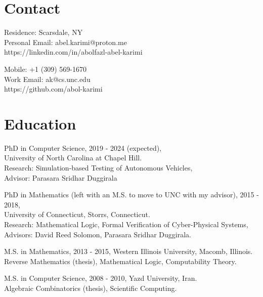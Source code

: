 \documentclass[margin]{res}
\begin{document}
\vspace*{-10mm}

\begin{resume}

\section{Contact}
\begin{minipage}[t]{0.5\textwidth}
    Residence: Scarsdale, NY \\
    Personal Email: abel.karimi@proton.me \\
    https://linkedin.com/in/abolfazl-abel-karimi
\end{minipage}
\hspace{5mm}
\begin{minipage}[t]{0.5\textwidth}
    Mobile: +1 (309) 569-1670 \\
    Work Email: ak@cs.unc.edu \\
    https://github.com/abol-karimi
\end{minipage}


\section{Education}
PhD in Computer Science, 2019 - 2024 (expected), \\
University of North Carolina at Chapel Hill. \\
{\scriptsize Research: Simulation-based Testing of Autonomous Vehicles, \\
Advisor: Parasara Sridhar Duggirala}
 
PhD in Mathematics (left with an M.S. to move to UNC with my advisor), 2015 - 2018, \\
University of Connecticut, Storrs, Connecticut. \\
{\scriptsize Research: Mathematical Logic, Formal Verification of Cyber-Physical Systems, \\
Advisors: David Reed Solomon, Parasara Sridhar Duggirala.}

M.S. in Mathematics, 2013 - 2015, Western Illinois University, Macomb, Illinois. \\
{\scriptsize Reverse Mathematics (thesis), Mathematical Logic, Computability Theory.}

M.S. in Computer Science, 2008 - 2010, Yazd University, Iran. \\
{\scriptsize Algebraic Combinatorics (thesis), Scientific Computing. }


\end{resume}
\end{document}
